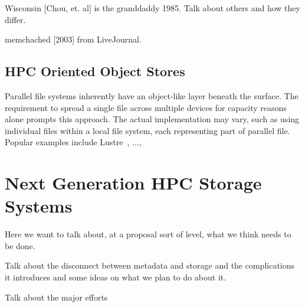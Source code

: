 Wisconsin [Chou, et. al] is the granddaddy 1985. Talk about others and how they differ.


memchached [2003] from LiveJournal.

\subsection{HPC Oriented Object Stores}

Parallel file systems inherently have an object-like layer beneath the surface.
The requirement to spread a single file across multiple devices for capacity
reasons alone prompts this approach. The actual implementation may vary, such
as using individual files within a local file system, each representing part
of parallel file. Popular examples include Lustre~\cite{lustre}, ...,

\section{Next Generation HPC Storage Systems}\label{sec:intro}

Here we want to talk about, at a proposal sort of level, what we think needs
to be done.

Talk about the disconnect between metadata and storage and the complications
it introduces and some ideas on what we plan to do about it.

Talk about the major efforts

